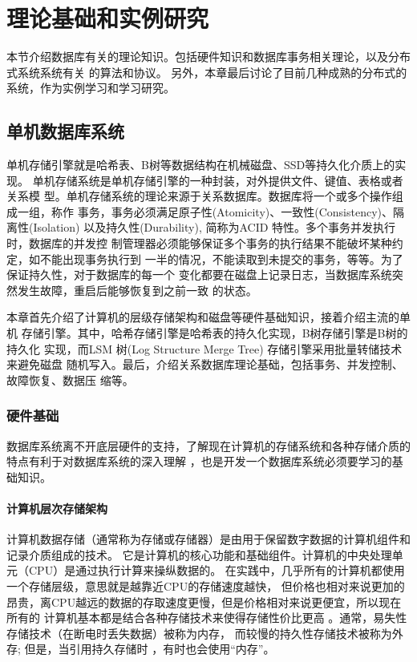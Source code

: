 
\chapter{理论基础和实例研究}
本节介绍数据库有关的理论知识。包括硬件知识和数据库事务相关理论，以及分布式系统系统有关
的算法和协议。
另外，本章最后讨论了目前几种成熟的分布式的系统，作为实例学习和学习研究。
\section{单机数据库系统}
单机存储引擎就是哈希表、B树等数据结构在机械磁盘、SSD等持久化介质上的实现。
单机存储系统是单机存储引擎的一种封装，对外提供文件、键值、表格或者关系模
型。单机存储系统的理论来源于关系数据库。数据库将一个或多个操作组成一组，称作
事务，事务必须满足原子性(Atomicity)、一致性(Consistency)、隔离性(Isolation)
以及持久性(Durability), 简称为ACID 特性。多个事务并发执行时，数据库的并发控
制管理器必须能够保证多个事务的执行结果不能破坏某种约定，如不能出现事务执行到
一半的情况，不能读取到未提交的事务，等等。为了保证持久性，对于数据库的每一个
变化都要在磁盘上记录日志，当数据库系统突然发生故障，重启后能够恢复到之前一致
的状态。

本章首先介绍了计算机的层级存储架构和磁盘等硬件基础知识，接着介绍主流的单机
存储引擎。其中，哈希存储引擎是哈希表的持久化实现，B树存储引擎是B树的持久化
实现，而LSM 树(Log Structure Merge Tree) 存储引擎采用批量转储技术来避免磁盘
随机写入。最后，介绍关系数据库理论基础，包括事务、并发控制、故障恢复、数据压
缩等。
\subsection{硬件基础}
数据库系统离不开底层硬件的支持，了解现在计算机的存储系统和各种存储介质的特点有利于对数据库系统的深入理解
，也是开发一个数据库系统必须要学习的基础知识。
\subsubsection{计算机层次存储架构}
计算机数据存储（通常称为存储或存储器）是由用于保留数字数据的计算机组件和记录介质组成的技术。
它是计算机的核心功能和基础组件。计算机的中央处理单元（CPU）是通过执行计算来操纵数据的。
在实践中，几乎所有的计算机都使用一个存储层级，意思就是越靠近CPU的存储速度越快，
但价格也相对来说更加的昂贵，离CPU越远的数据的存取速度更慢，但是价格相对来说更便宜，所以现在所有的
计算机基本都是结合各种存储技术来使得存储性价比更高
。通常，易失性存储技术（在断电时丢失数据）被称为内存，
而较慢的持久性存储技术被称为外存; 但是，当引用持久存储时
，有时也会使用“内存”。

